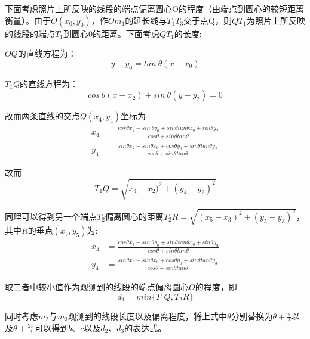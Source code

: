 \documentclass[a4paper,10.5pt]{ctexart}
\begin{document}
\par 下面考虑照片上所反映的线段的端点偏离圆心O的程度（由端点到圆心的较短距离衡量）。由于$O(x_0,y_0)$，作$Om_1$的延长线与$T_1T_3$交于点Q，则$QT_1$为照片上所反映的线段的端点$T_1$到圆心$0$的距离。下面考虑$QT_1$的长度:
\par $OQ$的直线方程为：$$y-y_0=tan\ \theta(x-x_0)$$
\par $T_1Q$的直线方程为：$$cos\ \theta(x-x_2)+sin\ \theta(y-y_2)=0$$
\par 故而两条直线的交点$Q(x_4,y_4)$坐标为
\begin{equation}
\begin{aligned}
x_4&=\frac{cos\theta x_2-sin\ \theta y_0+sin\theta tan\theta x_0+sin\theta y_2}{cos\theta+sin\theta tan\theta}\\
y_4&=\frac{sin\theta x_2-sin\theta x_0+cos\theta y_0+sin\theta tan\theta y_2}{cos\theta+sin\theta tan\theta}
\end{aligned}
\end{equation}
\par 故而
$$T_1Q=\sqrt{x_4-x_2)^2+(y_4-y_2)^2}$$
\par 同理可以得到另一个端点$T_2$偏离圆心的距离$T_2R=\sqrt{(x_5-x_3)^2+(y_5-y_3)^2}$，其中$R$的垂点$(x_5,y_5)$为:
\begin{equation}
\begin{aligned}
x_4&=\frac{cos\theta x_3-sin\ \theta y_0+sin\theta tan\theta x_0+sin\theta y_3}{cos\theta+sin\theta tan\theta}\\
y_4&=\frac{sin\theta x_3-sin\theta x_0+cos\theta y_0+sin\theta tan\theta y_3}{cos\theta+sin\theta tan\theta}
\end{aligned}
\end{equation}
\par 取二者中较小值作为观测到的线段的端点偏离圆心$O$的程度，即
$$d_1=min\{T_1Q,T_2R\}$$
\par 同时考虑$m_2$与$m_3$观测到的线段长度以及偏离程度，将上式中$\theta$分别替换为$\theta+\frac{\pi}{3}$以及$\theta+\frac{2\pi}{3}$可以得到$b$、$c$以及$d_2$、$d_3$的表达式。
\end{document}
